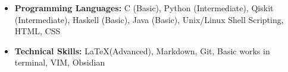 \documentclass[10pt,a4paper,sans,colorlinks]{moderncv}        %
\begin{document}
\begin{itemize}

	\item \textbf{Programming Languages:} C (Basic), Python (Intermediate), Qiskit (Intermediate), Haskell (Basic), Java (Basic), Unix/Linux Shell Scripting, HTML, CSS

	\item \textbf{Technical Skills:} \LaTeX (Advanced), Markdown, Git, Basic works in terminal, VIM, Obsidian


\end{itemize}
%
%
%
%
%	


\end{document}
